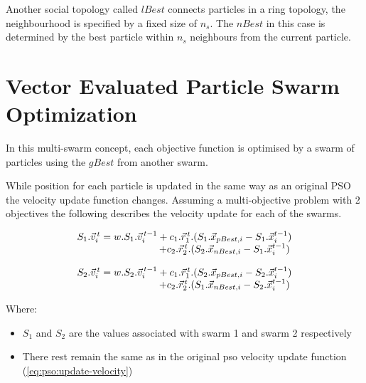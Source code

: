 \documentclass[conference]{IEEEtran}
\begin{document}
    Another social topology called $ lBest $ connects particles in a ring topology, the neighbourhood is specified by a fixed size of $ n_s $. The $ nBest $ in this case is determined by the best particle within $ n_s $ neighbours from the current particle\cite{vanwyk:overfitting-psoffnn}. 
    
\section{Vector Evaluated Particle Swarm Optimization}
In this multi-swarm concept, each objective function is optimised by a swarm of particles using the $gBest$ from another swarm\cite{kian-lim:pso}.

While position for each particle is updated in the same way as an original \ac{PSO} the velocity update function changes. Assuming a multi-objective problem with 2 objectives the following describes the velocity update for each of the swarms.

\begin{equation} \label{eq:vepso:update-velocity}
\begin{array}{l}
S_1.\vec{v}_{i}^{\,t} = w . S_1 . \vec{v}_{i}^{\,t-1} + c_1 . \vec{r}_{1}^{\,t} . (S_1 . \vec{x}_{pBest, i} - S_1 . \vec{x}_{i}^{t-1})\\
\hspace{29mm} + c_2 . \vec{r}_{2}^{\,t} . (S_2 . \vec{x}_{nBest, i} - S_1 . \vec{x}_{i}^{t-1})
\end{array}
\end{equation}

\begin{equation} \label{eq:vepso:update-velocity2}
\begin{array}{l}
S_2.\vec{v}_{i}^{\,t} = w . S_2 . \vec{v}_{i}^{\,t-1} + c_1 . \vec{r}_{1}^{\,t} . (S_2 . \vec{x}_{pBest, i} - S_2 . \vec{x}_{i}^{t-1})\\
\hspace{29mm} + c_2 . \vec{r}_{2}^{\,t} . (S_1 . \vec{x}_{nBest, i} - S_2 . \vec{x}_{i}^{t-1})
\end{array}
\end{equation}

\noindent Where:
\begin{itemize}
    \item $S_1$ and $S_2$ are the values associated with swarm 1 and swarm 2 respectively
	\item There rest remain the same as in the original pso velocity update function (\ref{eq:pso:update-velocity})
\end{itemize}
\vspace{5mm}
\end{document}
